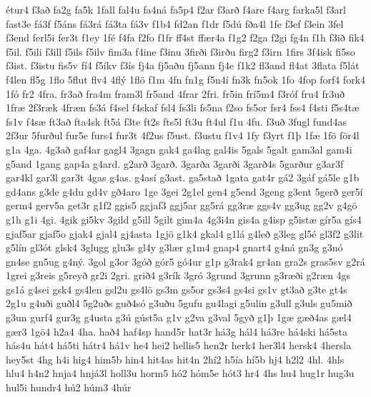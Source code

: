 {^^e9tur4
f3a^^f0
fa2g
fa5k
1fall
fal4u
fa4n^^e1
fa5p4
f2ar
f3ar^^f0
f4are
f4arg
farka5l
f3arl
fast3e
f^^e13f
f5^^e1ns
f^^e13r^^e1
f^^e13ta
f^^e13v
f1b4
fd2an
f1dr
f5d^^fa
f^^f0a4l
1fe
f3ef
f3ein
3fel
f3end
ferl5i
fer3t
f1ey
1f^^e9
f4fa
f2fo
f1fr
ff4st
ff^^e6r4a
f1g2
f2ga
f2gi
fg4n
f1h
f3i^^f0
fik4
f5il.
f5ili
f3ill
f5ils
f5ilv
fim3a
f4ine
f3inu
3fir^^f0i
f3ir^^f0u
firg2
f3irn
1firs
3f4isk
fi5so
f3ist.
f3istu
fis5v
f^^ed4
f5^^edkv
f3^^eds
fj4a
fj5a^^f0u
fj5ann
fj4e
f1k2
fl3and
fl4at
3flata
f5l^^e1t
f4len
fl5g
1flo
5flut
flv4
4fl^^fd
1fl^^f6
f1m
4fn
fn1g
f5n4^^ed
fn3k
fn5ok
1fo
4fop
forf4
fork4
1f^^f3
fr2
4fra.
fr3a^^f0
fra4m
fram3l
fr5and
4frar
2fri.
fr5in
fr^^ed5m4
f3r^^f3f
fru4
fr3u^^f0
1fr^^e6
2f3r^^e6k
4fr^^e6n
fs3^^e1
f4sel
f4skaf
fsl4
fs3li
fs5na
f2so
fs5or
fsr4
fss4
f4sti
f5s4t^^e6
fs1v
f4s^^e6
ft3a^^f0
fta4sk
ft5^^e1
f3te
ft2s
fts5l
ft3u
ft4ul
f1u
4fu.
f3u^^f0
3fugl
fund4as
2f3ur
5fur^^f0ul
fur5e
furs4
fur3t
4f2us
f5ust.
f3ustu
f1v4
1fy
f3yrt
f1^^fe
1f^^e6
1f^^f6
f^^f6r4l
g1a
4ga.
4g3a^^f0
gaf4ar
gagl4
3gagn
gak4
ga4lag
gal4is
5gals
5galt
gam3al
gam4i
g5and
1gang
gap4a
g4ard.
g2ar^^f0
3gar^^f0.
3gar^^f0a
3gar^^f0i
3gar^^f04s
5gar^^f0ur
g3ar3f
gar4kl
gar3l
gar3t
4gas
g4as.
g4as^^ed
g3ast.
ga5sta^^f0
1gata
gat4r
g^^e12
3g^^e1f
g^^e15le
g1b
gd4ans
g3de
g4du
gd4v
g^^f04aro
1ge
3gei
2g1el
gen4
g5end
3geng
g3ent
5ger^^f0
ger5^^ed
germ4
gerv5a
get3r
g1f2
ggis5
ggjaf3
ggj5ar
gg5r^^e1
gg3r^^e6
ggs4v
gg3ug
gg2v
g4g^^f6
g1h
g1i
4gi.
4gik
gi5kv
3gild
g5ill
5gilt
gim4a
4g3i4n
gis4a
g4isp
g5ist^^e6
g^^edr5a
g^^eds4
gjaf5ar
gjaf5o
gjak4
gjal4
gj4asta
1gj^^f6
g1k4
gkal4
g1l^^e1
g4le^^f0
g3leg
gl5^^e9
gl3f2
g3lit
g5l^^edn
gl3^^f3t
glsk4
3glugg
glu3s
gl4y
g3l^^e6r
g1m4
gnap4
gnart4
g4n^^e1
gn3g
g3n^^f3
gn4se
gn5ug
g4n^^fd.
3gol
g3or
3g^^f3^^f0
g^^f3r5
g^^f34ur
g1p
g3rak4
gr4an
gra2s
gras5sv
g2r^^e1
1grei
g3reis
g5rey^^f0
gr2i
2gri.
gri^^f04
g3r^^edk
3gr^^f3
3grund
3grunn
g3r^^e6^^f0i
g2r^^e6n
4gs
gs1^^e1
g4sei
gsk4
gs4len
gsl2u
gs4l^^f6
gs3m
gs5or
gs3s4
gs4si
gs1v
gt3a^^f0
g3te
gt4s
2g1u
g4u^^f0i
gu^^f0l4
5g2u^^f0s
gu^^f04s^^f3
g3u^^f0u
5gufu
gu4lagi
g5ulin
g3ull
g3uls
gu5mi^^f0
g3un
gurf4
gur3g
g4usta
g3^^fa
g^^fast5a
g1v
g2va
g3val
5gy^^f0
g1^^fe
1g^^e6
g^^e6^^f04as
g^^e6l4
g^^e6r3
1g^^f64
h2a4
4ha.
ha^^f04
haf4sp
hand5r
hat3r
h^^e13g
h^^e1l4
h^^e13re
h^^e14ski
h^^e15sta
h^^e1s4u
h^^e1t4
h^^e15ti
h^^e1tr4
h^^e11v
he4
hei2
hellis5
hen2r
herk4
her3l4
hersk4
4hersla
hey5st
4hg
h4i
hig4
him5b
hin4
hit4as
hit4n
2h^^ed2
h5^^eda
h^^ed5b
hj4
h2l2
4hl.
4hls
hlu4
h4n2
hnja4
hnj^^e13l
holl3u
horm5
h^^f32
h^^f3m5e
h^^f3t3
hr4
4hs
hu4
hug1r
hug3u
hul5i
hundr4
h^^fa2
h^^fam3
4h^^far
}
